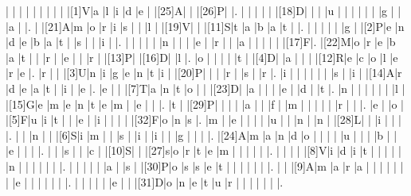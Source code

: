 \documentclass[12pt]{article}
\begin{document}
\begin{Puzzle}{22}{22}
  |{}  |{}  |{}  |{}  |{}  |{}  |{}  |{}  |{}  |[1]V|a   |l   |i   |d   |e   |{}  |[25]A|{}  |{}  |[26]P|{}  |.
  |{}  |{}  |{}  |{}  |{}  |[18]D|{}  |{}  |{}  |u   |{}  |{}  |{}  |{}  |{}  |{}  |g   |{}  |{}  |a   |{}  |.
  |{}  |[21]A|m   |o   |r   |i   |s   |{}  |{}  |l   |{}  |[19]V|{}  |{}  |[11]S|t   |a   |b   |a   |t   |{}  |.
  |{}  |{}  |{}  |{}  |{}  |g   |{}  |[2]P|e   |n   |d   |e   |b   |a   |t   |{}  |s   |{}  |{}  |i   |{}  |.
  |{}  |{}  |{}  |{}  |{}  |n   |{}  |{}  |{}  |e   |{}  |r   |{}  |{}  |a   |{}  |{}  |{}  |{}  |{}  |[17]F|.
  |[22]M|o   |r   |e   |b   |a   |t   |{}  |{}  |r   |{}  |e   |{}  |{}  |r   |{}  |[13]P|{}  |[16]D|{}  |l   |.
  |o   |{}  |{}  |{}  |{}  |t   |{}  |[4]D|{}  |a   |{}  |{}  |{}  |[12]R|e   |c   |o   |l   |e   |r   |e   |.
  |r   |{}  |{}  |[3]U|n   |i   |g   |e   |n   |t   |i   |{}  |[20]P|{}  |{}  |{}  |r   |{}  |s   |{}  |r   |.
  |i   |{}  |{}  |{}  |{}  |{}  |{}  |s   |{}  |i   |{}  |[14]A|r   |d   |e   |a   |t   |{}  |i   |{}  |e   |.
  |e   |{}  |{}  |[7]T|a   |n   |t   |o   |{}  |{}  |[23]D|{}  |a   |{}  |{}  |{}  |e   |{}  |d   |{}  |t   |.
  |n   |{}  |{}  |{}  |{}  |{}  |{}  |l   |{}  |[15]G|e   |m   |e   |n   |t   |e   |m   |{}  |e   |{}  |{}  |.
  |t   |{}  |[29]P|{}  |{}  |{}  |{}  |a   |{}  |{}  |f   |{}  |m   |{}  |{}  |{}  |{}  |{}  |r   |{}  |{}  |.
  |e   |{}  |o   |{}  |[5]F|u   |i   |t   |{}  |{}  |e   |{}  |i   |{}  |{}  |{}  |{}  |[32]F|o   |n   |s   |.
  |m   |{}  |e   |{}  |{}  |{}  |{}  |u   |{}  |{}  |n   |{}  |n   |{}  |[28]L|{}  |{}  |i   |{}  |{}  |{}  |.
  |{}  |{}  |n   |{}  |{}  |[6]S|i   |m   |{}  |{}  |s   |{}  |i   |{}  |i   |{}  |{}  |g   |{}  |{}  |{}  |.
  |[24]A|m   |a   |n   |d   |o   |{}  |{}  |{}  |{}  |u   |{}  |{}  |{}  |b   |{}  |{}  |e   |{}  |{}  |{}  |.
  |{}  |{}  |s   |{}  |{}  |c   |{}  |[10]S|{}  |{}  |[27]s|o   |r   |t   |e   |m   |{}  |{}  |{}  |{}  |{}  |.
  |{}  |{}  |{}  |{}  |[8]V|i   |d   |i   |t   |{}  |{}  |{}  |{}  |{}  |n   |{}  |{}  |{}  |{}  |{}  |{}  |.
  |{}  |{}  |{}  |{}  |{}  |a   |{}  |s   |{}  |[30]P|o   |s   |s   |e   |t   |{}  |{}  |{}  |{}  |{}  |{}  |.
  |{}  |{}  |[9]A|m   |a   |r   |a   |{}  |{}  |{}  |{}  |{}  |{}  |{}  |e   |{}  |{}  |{}  |{}  |{}  |{}  |.
  |{}  |{}  |{}  |{}  |{}  |e   |{}  |{}  |[31]D|o   |n   |e   |t   |u   |r   |{}  |{}  |{}  |{}  |{}  |{}  |.
\end{Puzzle}
\end{document}
